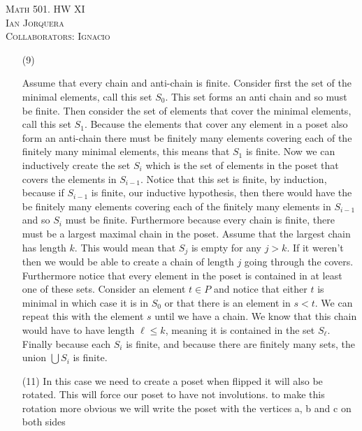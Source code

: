 \documentclass[12pt]{amsart}
\theoremstyle{definition}
\newcommand{\ra}{\rightarrow}
\begin{document}
\begin{center}
    \textsc{Math 501. HW XI\\ Ian Jorquera\\ Collaborators: Ignacio}
\end{center}
\vspace{1em}

\begin{itemize}

\item[(9)] %

Assume that every chain and anti-chain is finite.
Consider first the set of the minimal elements, call this set $S_0$. This set forms an anti chain and so must be finite. Then consider the set of elements that cover the minimal elements, call this set $S_1$. Because the elements that cover any element in a poset also form an anti-chain there must be finitely many elements covering each of the finitely many minimal elements, this means that $S_1$ is finite. Now we can inductively create the set $S_i$ which is the set of elements in the poset that covers the elements in $S_{i-1}$. Notice that this set is finite, by induction, because if $S_{i-1}$ is finite, our inductive hypothesis, then there would have the be finitely many elements covering each of the finitely many elements in $S_{i-1}$ and so $S_i$ must be finite. Furthermore because every chain is finite, there must be a largest maximal chain in the poset. Assume that the largest chain has length $k$. This would mean that $S_{j}$ is empty for any $j>k$. If it weren't then we would be able to create a chain of length $j$ going through the covers. Furthermore notice that every element in the poset is contained in at least one of these sets. Consider an element $t\in P$ and notice that either $t$ is minimal in which case it is in $S_0$ or that there is an element in $s<t$. We can repeat this with the element $s$ until we have a chain. We know that this chain would have to have length $\ell\leq k$, meaning it is contained in the set $S_{\ell}$. Finally because each $S_i$ is finite, and because there are finitely many sets, the union $\bigcup S_i$ is finite.\\



\item[(11)]  %
In this case we need to create a poset when flipped it will also be rotated. This will force our poset to have not involutions. to make this rotation more obvious we will write the poset with the vertices a, b and c on both sides


\end{itemize}
\end{document}
